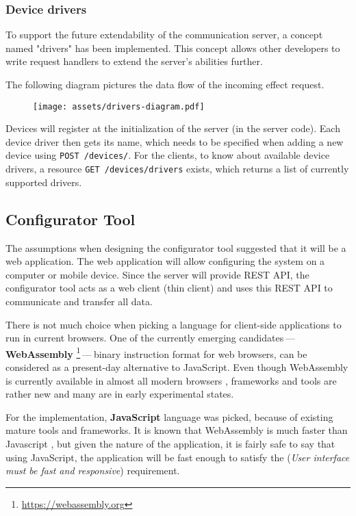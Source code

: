 \hypertarget{x-device-drivers}{\subsubsection*{Device drivers}}
To support the future extendability of the communication server, a concept named
"drivers" has been implemented. This concept allows other developers to write
request handlers to extend the server’s abilities further.


The following diagram pictures the data flow of the incoming effect request.


\begin{figure}[h]{}
\centering\texttt{[image: assets/drivers-diagram.pdf]}
\caption{}

\end{figure}

Devices will register at the initialization of the server (in the server code).
Each device driver then gets its name, which needs to be specified when adding a new
device using \texttt{POST /devices/}. For the clients, to know about available device
drivers, a resource \texttt{GET /devices/drivers} exists, which returns a list
of currently supported drivers.


\hypertarget{x-configurator-tool}{\subsection*{Configurator Tool}}
The assumptions when designing the configurator tool suggested that it will
be a web application. The web application will allow configuring the system
on a computer or mobile device. Since the server will provide REST API,
the configurator tool acts as a
web client (thin client) and uses this REST API to communicate and transfer
all data.


There is not much choice when picking a language for client-side applications
to run in current browsers. One of the currently
emerging candidates — \textbf{WebAssembly} \footnote{\href{https://webassembly.org}{https://webassembly.org}} — binary instruction format for web browsers, can be considered as
a present-day alternative to JavaScript. Even though WebAssembly is
currently available in almost all modern browsers \hyperlink{wasmroadmap}{}, frameworks
and tools are rather new and many are in early experimental states.


For the implementation, \textbf{JavaScript} language was picked, because
of existing mature tools and frameworks. It is known that WebAssembly
is much faster than Javascript \hyperlink{wasmfast}{}, but given the nature of the
application, it is fairly safe to say that using JavaScript, the application
will be fast enough to satisfy the \hyperlink{./05-analysis}{}
(\emph{User interface must be fast and responsive})
requirement.


